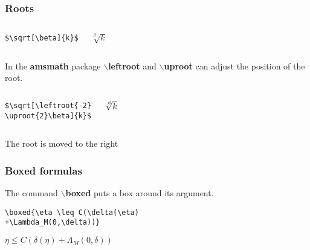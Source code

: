 \documentclass[12pt]{beamer}
\begin{document}
\begin{frame}[fragile]
\frametitle{Roots}
        \begin{columns}
        \begin{block}{}
        \begin{verbatim}
$\sqrt[\beta]{k}$
        \end{verbatim}
        \end{block}
        \begin{block}{}
        $\sqrt[\beta]{k}$
        \end{block}
    \end{columns}
 In the \textbf{amsmath} package $\backslash$\textbf{leftroot} and $\backslash$\textbf{uproot} can adjust the position of the root.
         \begin{columns}
        \begin{block}{}
        \begin{verbatim}
$\sqrt[\leftroot{-2}
\uproot{2}\beta]{k}$
        \end{verbatim}
        \end{block}
        \begin{block}{}
        $\sqrt[\leftroot{-2}\uproot{2}\beta]{k}$
        \end{block}
    \end{columns}
    The root is moved to the right
\end{frame}

\begin{frame}[fragile]
\frametitle{Boxed formulas}
The command $\backslash$\textbf{boxed} puts a box around its argument.\\
\begin{verbatim}
\boxed{\eta \leq C(\delta(\eta)
+\Lambda_M(0,\delta))}
\end{verbatim}
$\boxed{\eta \leq C(\delta(\eta) +\Lambda_M(0,\delta))}$
\end{frame}
\end{document}
